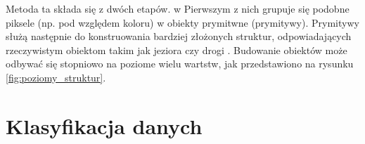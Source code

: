 Metoda ta składa się z dwóch etapów. w Pierwszym z nich grupuje się podobne piksele (np. pod względem koloru) w obiekty prymitwne (prymitywy). Prymitywy służą następnie do konstruowania bardziej złożonych 
struktur, odpowiadających rzeczywistym obiektom takim jak jeziora czy drogi \cite{Blaschke2014}.  Budowanie obiektów może odbywać się stopniowo na poziome wielu wartstw, jak przedstawiono na rysunku
\ref{fig:poziomy_struktur}.

\section{Klasyfikacja danych}

